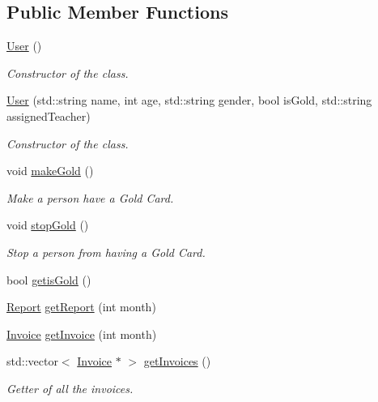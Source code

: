 \subsection*{Public Member Functions}
\begin{DoxyCompactItemize}
\item 
\mbox{\hyperlink{class_user_a4a0137053e591fbb79d9057dd7d2283d}{User}} ()
\begin{DoxyCompactList}\small\item\em Constructor of the class. \end{DoxyCompactList}\item 
\mbox{\hyperlink{class_user_a898c6748faa70dcd3d30e550be2eb768}{User}} (std\+::string name, int age, std\+::string gender, bool is\+Gold, std\+::string assigned\+Teacher)
\begin{DoxyCompactList}\small\item\em Constructor of the class. \end{DoxyCompactList}\item 
void \mbox{\hyperlink{class_user_a1ddb4cbabc84ef92ac92bfe6f9385d39}{make\+Gold}} ()
\begin{DoxyCompactList}\small\item\em Make a person have a Gold Card. \end{DoxyCompactList}\item 
void \mbox{\hyperlink{class_user_a88a8b41f134b21aeb702c481ffee0ef4}{stop\+Gold}} ()
\begin{DoxyCompactList}\small\item\em Stop a person from having a Gold Card. \end{DoxyCompactList}\item 
bool \mbox{\hyperlink{class_user_ac1af1ded379bd2fd56f96f90348520fe}{getis\+Gold}} ()
\item 
\mbox{\hyperlink{class_report}{Report}} \mbox{\hyperlink{class_user_ad5f236ca0846ae3fc493609f72d17a70}{get\+Report}} (int month)
\item 
\mbox{\hyperlink{class_invoice}{Invoice}} \mbox{\hyperlink{class_user_a4fafb4511574972c6e7801f2bb6a638b}{get\+Invoice}} (int month)
\item 
std\+::vector$<$ \mbox{\hyperlink{class_invoice}{Invoice}} $\ast$ $>$ \mbox{\hyperlink{class_user_aeb297e5cd248e1e2c0ae3540cbedcca8}{get\+Invoices}} ()
\begin{DoxyCompactList}\small\item\em Getter of all the invoices. \end{DoxyCompactList}\item 

\end{DoxyCompactItemize}
